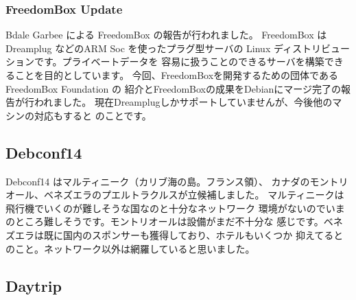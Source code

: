 \documentclass[mingoth,a4paper]{jsarticle}
\begin{document}
\subsubsection{FreedomBox Update}
Bdale Garbee による FreedomBox の報告が行われました。
FreedomBox は Dreamplug などのARM Soc を使ったプラグ型サーバの
Linux ディストリビューションです。プライベートデータを
容易に扱うことのできるサーバを構築できることを目的としています。
今回、FreedomBoxを開発するための団体である FreedomBox Foundation の
紹介とFreedomBoxの成果をDebianにマージ完了の報告が行われました。
現在Dreamplugしかサポートしていませんが、今後他のマシンの対応もすると
のことです。

\subsection{Debconf14}
Debconf14 はマルティニーク（カリブ海の島。フランス領）、 
カナダのモントリオール、ベネズエラのプエルトラクルスが立候補しました。
マルティニークは飛行機でいくのが難しそうな国なのと十分なネットワーク
環境がないのでいまのところ難しそうです。モントリオールは設備がまだ不十分な
感じです。ベネズエラは既に国内のスポンサーも獲得しており、ホテルもいくつか
抑えてるとのこと。ネットワーク以外は網羅していると思いました。

\subsection{Daytrip}
\end{document}
